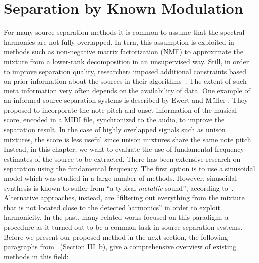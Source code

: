 \chapter{Separation by Known Modulation}
\label{cha:known}

For many source separation methods it is common to assume that the spectral harmonics are not fully overlapped.
In turn, this assumption is exploited in methods such as non-negative matrix factorization (NMF) to approximate the mixture from a lower-rank decomposition in an unsupervised way.
Still, in order to improve separation quality, researchers imposed additional constraints based on prior information about the sources in their algorithms~\cite{ozerov12}.
The extent of such meta information very often depends on the availability of data.
One example of an informed source separation systems is described by Ewert and M\"uller \cite{ewert12}.
They proposed to incorporate the note pitch and onset information of the musical score, encoded in a MIDI file, synchronized to the audio, to improve the separation result.
In the case of highly overlapped signals such as unison mixtures, the score is less useful since unison mixtures share the same note pitch.
Instead, in this chapter, we want to evaluate the use of fundamental frequency estimates of the source to be extracted.
There has been extensive research on separation using the fundamental frequency.
The first option is to use a sinusoidal model which was studied in a large number of methods.
However, sinusoidal synthesis is known to suffer from ``a typical \textit{metallic} sound'', according to~\cite{rafii}. 
Alternative approaches, instead, are ``filtering out everything from the mixture that is not located close to the detected harmonics'' in order to exploit harmonicity.
In the past, many related works focused on this paradigm, a procedure as it turned out to be a common task in source separation systems. 
Before we present our proposed method in the next section, the following paragraphs from~\cite{rafii} (Section III~b), give a comprehensive overview of existing methods in this field:


